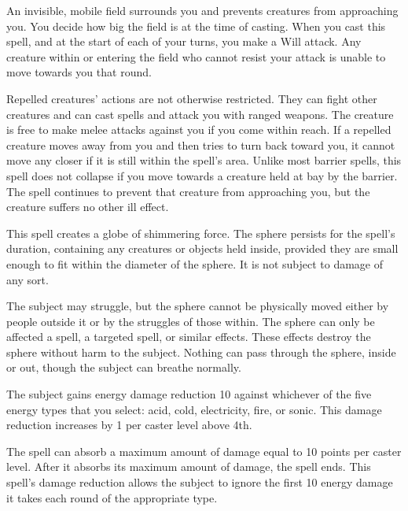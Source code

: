 \spelldur{\durshort \dismissable}
\spelleffect An invisible, mobile field surrounds you and prevents creatures from approaching you. You decide how big the field is at the time of casting. When you cast this spell, and at the start of each of your turns, you make a Will attack. Any creature within or entering the field who cannot resist your attack is unable to move towards you that round.

Repelled creatures' actions are not otherwise restricted. They can fight other creatures and can cast spells and attack you with ranged weapons. The creature is free to make melee attacks against you if you come within reach. If a repelled creature moves away from you and then tries to turn back toward you, it cannot move any closer if it is still within the spell's area.
\spellnotes Unlike most barrier spells, this spell does not collapse if you move towards a creature held at bay by the barrier. The spell continues to prevent that creature from approaching you, but the creature suffers no other ill effect.

\spelldur{\durshort \dismissable}
\spelleffect This spell creates a globe of shimmering force. The sphere persists for the spell's duration, containing any creatures or objects held inside, provided they are small enough to fit within the diameter of the sphere. It is not subject to damage of any sort.
\par The subject may struggle, but the sphere cannot be physically moved either by people outside it or by the struggles of those within.
\spellnotes The sphere can only be affected a  spell, a targeted  spell, or similar effects. These effects destroy the sphere without harm to the subject. Nothing can pass through the sphere, inside or out, though the subject can breathe normally.

\spelleffect The subject gains energy damage reduction 10 against whichever of the five energy types that you select: acid, cold, electricity, fire, or sonic. This damage reduction increases by 1 per caster level above 4th.
\par The spell can absorb a maximum amount of damage equal to 10 points per caster level. After it absorbs its maximum amount of damage, the spell ends.
\spellnotes This spell's damage reduction allows the subject to ignore the first 10 energy damage it takes each round of the appropriate type.

